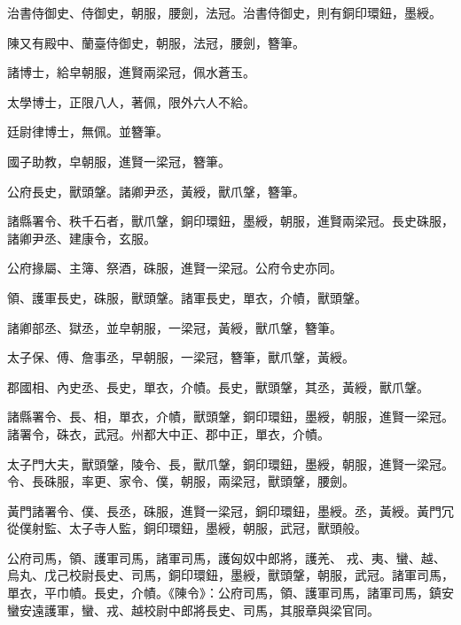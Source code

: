\begin{pinyinscope}
 治書侍御史、侍御史，朝服，腰劍，法冠。治書侍御史，則有銅印環鈕，墨綬。



 陳又有殿中、蘭臺侍御史，朝服，法冠，腰劍，簪筆。



 諸博士，給皁朝服，進賢兩梁冠，佩水蒼玉。



 太學博士，正限八人，著佩，限外六人不給。



 廷尉律博士，無佩。並簪筆。



 國子助教，皁朝服，進賢一梁冠，簪筆。



 公府長史，獸頭鞶。諸卿尹丞，黃綬，獸爪鞶，簪筆。



 諸縣署令、秩千石者，獸爪鞶，銅印環鈕，墨綬，朝服，進賢兩梁冠。長史硃服，諸卿尹丞、建康令，玄服。



 公府掾屬、主簿、祭酒，硃服，進賢一梁冠。公府令史亦同。



 領、護軍長史，硃服，獸頭鞶。諸軍長史，單衣，介幘，獸頭鞶。



 諸卿部丞、獄丞，並皁朝服，一梁冠，黃綬，獸爪鞶，簪筆。



 太子保、傅、詹事丞，早朝服，一梁冠，簪筆，獸爪鞶，黃綬。



 郡國相、內史丞、長史，單衣，介幘。長史，獸頭鞶，其丞，黃綬，獸爪鞶。



 諸縣署令、長、相，單衣，介幘，獸頭鞶，銅印環鈕，墨綬，朝服，進賢一梁冠。諸署令，硃衣，武冠。州都大中正、郡中正，單衣，介幘。



 太子門大夫，獸頭鞶，陵令、長，獸爪鞶，銅印環鈕，墨綬，朝服，進賢一梁冠。令、長硃服，率更、家令、僕，朝服，兩梁冠，獸頭鞶，腰劍。



 黃門諸署令、僕、長丞，硃服，進賢一梁冠，銅印環鈕，墨綬。丞，黃綬。黃門冗從僕射監、太子寺人監，銅印環鈕，墨綬，朝服，武冠，獸頭般。



 公府司馬，領、護軍司馬，諸軍司馬，護匈奴中郎將，護羌、
 戎、夷、蠻、越、烏丸、戊己校尉長史、司馬，銅印環鈕，墨綬，獸頭鞶，朝服，武冠。諸軍司馬，單衣，平巾幘。長史，介幘。《陳令》：公府司馬，領、護軍司馬，諸軍司馬，鎮安蠻安遠護軍，蠻、戎、越校尉中郎將長史、司馬，其服章與梁官同。




\end{pinyinscope}
